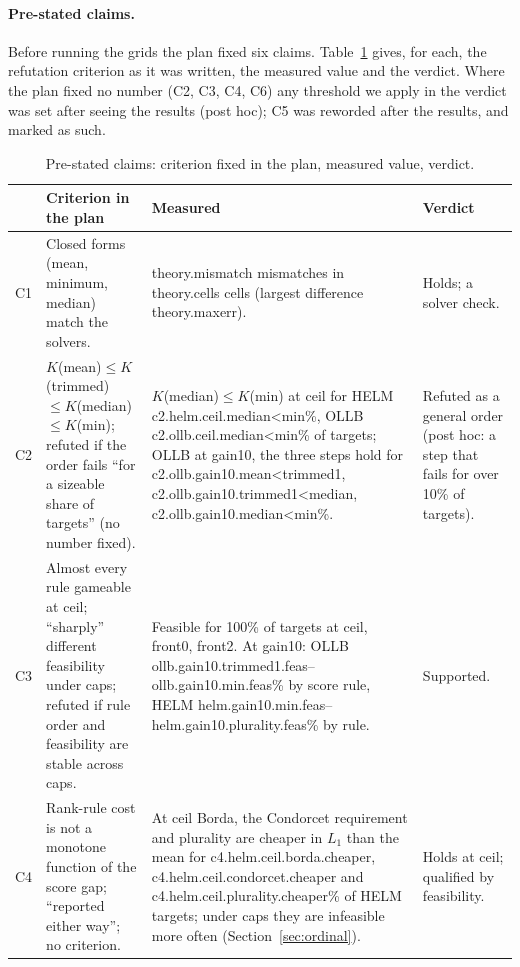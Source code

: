 \paragraph{Pre-stated claims.}
Before running the grids the plan fixed six claims. Table~\ref{tab:claims} gives, for each, the refutation criterion as it was written, the measured value and the verdict. Where the plan fixed no number (C2, C3, C4, C6) any threshold we apply in the verdict was set after seeing the results (post hoc); C5 was reworded after the results, and marked as such.
\begin{table}[t]
\caption{Pre-stated claims: criterion fixed in the plan, measured value, verdict.}\label{tab:claims}
\centering
\fontsize{8}{9.5}\selectfont
\begin{tabular}{@{}p{0.3in} p{1.4in} p{2.3in} p{0.8in}@{}}
\toprule
 & Criterion in the plan & Measured & Verdict \\
\midrule
C1 & Closed forms (mean, minimum, median) match the solvers. & \num{theory.mismatch} mismatches in \num{theory.cells} cells (largest difference \num{theory.maxerr}). & Holds; a solver check. \\
C2 & $K$(mean)$\le K$(trimmed)$\le K$(median)$\le K$(min); refuted if the order fails ``for a sizeable share of targets'' (no number fixed). & $K$(median)$\le K$(min) at \textsf{ceil} for HELM \num{c2.helm.ceil.median<min}\%, OLLB \num{c2.ollb.ceil.median<min}\% of targets; OLLB at \textsf{gain10}, the three steps hold for \num{c2.ollb.gain10.mean<trimmed1}, \num{c2.ollb.gain10.trimmed1<median}, \num{c2.ollb.gain10.median<min}\%. & Refuted as a general order (post hoc: a step that fails for over 10\% of targets). \\
C3 & Almost every rule gameable at \textsf{ceil}; ``sharply'' different feasibility under caps; refuted if rule order and feasibility are stable across caps. & Feasible for 100\% of targets at \textsf{ceil}, \textsf{front0}, \textsf{front2}. At \textsf{gain10}: OLLB \num{ollb.gain10.trimmed1.feas}--\num{ollb.gain10.min.feas}\% by score rule, HELM \num{helm.gain10.min.feas}--\num{helm.gain10.plurality.feas}\% by rule. & Supported. \\
C4 & Rank-rule cost is not a monotone function of the score gap; ``reported either way''; no criterion. & At \textsf{ceil} Borda, the Condorcet requirement and plurality are cheaper in $L_1$ than the mean for \num{c4.helm.ceil.borda.cheaper}, \num{c4.helm.ceil.condorcet.cheaper} and \num{c4.helm.ceil.plurality.cheaper}\% of HELM targets; under caps they are infeasible more often (Section~\ref{sec:ordinal}). & Holds at \textsf{ceil}; qualified by feasibility. \\

\end{tabular}
\end{table}
